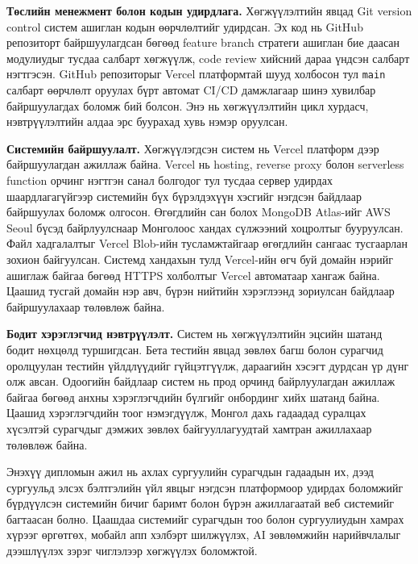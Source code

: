 \begin{sloppypar}
\par \textbf{Төслийн менежмент болон кодын удирдлага.}
Хөгжүүлэлтийн явцад Git version control систем ашиглан кодын өөрчлөлтийг удирдсан. Эх код нь GitHub репозиторт байршуулагдсан бөгөөд feature branch стратеги ашиглан бие даасан модулиудыг тусдаа салбарт хөгжүүлж, code review хийсний дараа үндсэн салбарт нэгтгэсэн. GitHub репозиторыг Vercel платформтай шууд холбосон тул \texttt{main} салбарт өөрчлөлт оруулах бүрт автомат CI/CD дамжлагаар шинэ хувилбар байршуулагдах боломж бий болсон. Энэ нь хөгжүүлэлтийн цикл хурдасч, нэвтрүүлэлтийн алдаа эрс буурахад хувь нэмэр оруулсан.

\par \textbf{Системийн байршуулалт.}
Хөгжүүлэгдсэн систем нь Vercel платформ дээр байршуулагдан ажиллаж байна. Vercel нь hosting, reverse proxy болон serverless function орчинг нэгтгэн санал болгодог тул тусдаа сервер удирдах шаардлагагүйгээр системийн бүх бүрэлдэхүүн хэсгийг нэгдсэн байдлаар байршуулах боломж олгосон. Өгөгдлийн сан болох MongoDB Atlas-ийг AWS Seoul бүсэд байрлуулснаар Монголоос хандах сүлжээний хоцролтыг бууруулсан. Файл хадгалалтыг Vercel Blob-ийн тусламжтайгаар өгөгдлийн сангаас тусгаарлан зохион байгуулсан. Системд хандахын тулд Vercel-ийн өгч буй домайн нэрийг ашиглаж байгаа бөгөөд HTTPS холболтыг Vercel автоматаар хангаж байна. Цаашид тусгай домайн нэр авч, бүрэн нийтийн хэрэглээнд зориулсан байдлаар байршуулахаар төлөвлөж байна.

\par \textbf{Бодит хэрэглэгчид нэвтрүүлэлт.}
Систем нь хөгжүүлэлтийн эцсийн шатанд бодит нөхцөлд туршигдсан. Бета тестийн явцад зөвлөх багш болон сурагчид оролцуулан тестийн үйлдлүүдийг гүйцэтгүүлж, дараагийн хэсэгт дурдсан үр дүнг олж авсан. Одоогийн байдлаар систем нь прод орчинд байрлуулагдан ажиллаж байгаа бөгөөд анхны хэрэглэгчдийн бүлгийг онбординг хийх шатанд байна. Цаашид хэрэглэгчдийн тоог нэмэгдүүлж, Монгол дахь гадаадад суралцах хүсэлтэй сурагчдыг дэмжих зөвлөх байгууллагуудтай хамтран ажиллахаар төлөвлөж байна.

\par Энэхүү дипломын ажил нь ахлах сургуулийн сурагчдын гадаадын их, дээд сургуульд элсэх бэлтгэлийн үйл явцыг нэгдсэн платформоор удирдах боломжийг бүрдүүлсэн системийн бичиг баримт болон бүрэн ажиллагаатай веб системийг багтаасан болно. Цаашдаа системийг сурагчдын тоо болон сургуулиудын хамрах хүрээг өргөтгөх, мобайл апп хэлбэрт шилжүүлэх, AI зөвлөмжийн нарийвчлалыг дээшлүүлэх зэрэг чиглэлээр хөгжүүлэх боломжтой.
\end{sloppypar}
